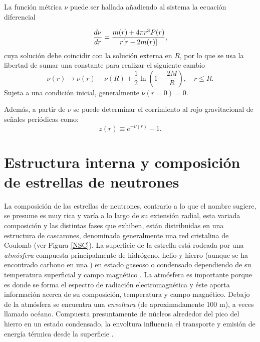 La función métrica $\nu$ puede ser hallada añadiendo al sistema la ecuación diferencial

\begin{equation}
    \dv{\nu}{r} = \frac { m ( r ) + 4 \pi r ^ { 3 } P ( r ) } { r [ r - 2 m ( r ) ] },
\end{equation}
cuya solución debe coincidir con la solución externa en $R$, por lo que se usa la libertad de sumar una constante para realizar el siguiente cambio
\begin{equation}
    \nu ( r ) \longrightarrow \nu ( r ) - \nu ( R ) + \frac { 1 } { 2 } \ln \left( 1 - \frac { 2 M } { R } \right) , \quad r \leq R.
\end{equation}
Sujeta a una condición inicial, generalmente $\nu(r=0)=0$.

Además, a partir de $\nu$ se puede determinar el corrimiento al rojo gravitacional de señales periódicas \cite{Haensel2007NeutronStructure} como:
\begin{equation}
    z(r)\equiv e^{-\nu(r)}-1.
    \label{redshift}
\end{equation}



\section{Estructura interna y composición de estrellas de neutrones}

La composición de las estrellas de neutrones, contrario a lo que el nombre sugiere, se presume es muy rica y varía a lo largo de su extensión radial, esta variada composición y las distintas fases que exhiben, están distribuidas en una estructura de cascarones, denominada generalmente una red cristalina de Coulomb (ver Figura \ref{NSC}).
La superficie de la estrella está rodeada por una \emph{atmósfera} compuesta principalmente de hidrógeno, helio y hierro (aunque se ha encontrado carbono en una \cite{Ho2009ARemnant}) en estado gaseoso o condensado dependiendo de su temperatura superficial y campo magnético \cite{Zavlin2002ModelingAtmospheres}. La atmósfera es importante porque es donde se forma el espectro de radiación electromagnética y éste aporta información acerca de su composición, temperatura y campo magnético.
Debajo de la atmósfera se encuentra una \emph{envoltura} (de aproximadamente 100 \si{\metre}), a veces llamado océano. Compuesta presuntamente de núcleos alrededor del pico del hierro en un estado condensado, la envoltura influencia el transporte y emisión de energía térmica desde la superficie \cite{Piekarewicz2013,Potekhin,Lattimer2004}.




